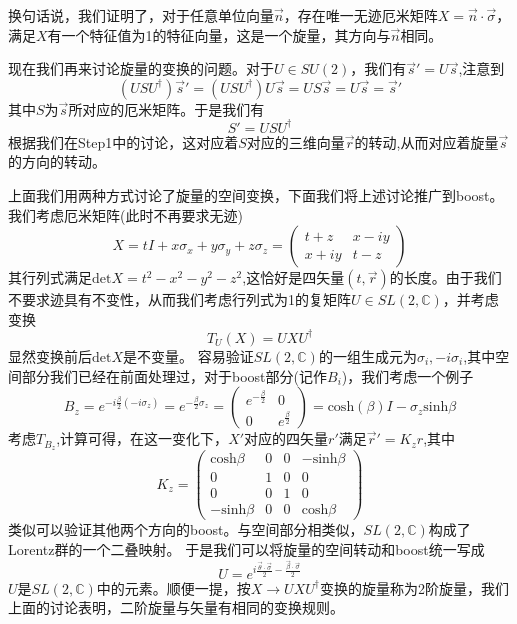换句话说，我们证明了，对于任意单位向量$\vec{n}$，存在唯一无迹厄米矩阵$X=\vec{n}\cdot\vec{\sigma}$，满足$X$有一个特征值为1的特征向量，这是一个旋量，其方向与$\vec{n}$相同。

现在我们再来讨论旋量的变换的问题。对于$U\in SU(2)$，我们有$\vec{s}'=U\vec{s}$,注意到
\begin{equation}
    (USU^{\dagger})\vec{s}'=(USU^{\dagger})U\vec{s}=US\vec{s}=U\vec{s}=\vec{s}'
\end{equation}
其中$S$为$\vec{s}$所对应的厄米矩阵。于是我们有
\begin{equation}
    S'=USU^{\dagger}
\end{equation}
根据我们在Step1中的讨论，这对应着$S$对应的三维向量$\vec{r}$的转动,从而对应着旋量$\vec{s}$的方向的转动。

上面我们用两种方式讨论了旋量的空间变换，下面我们将上述讨论推广到boost。
我们考虑厄米矩阵(此时不再要求无迹)
\begin{equation}
    X=tI+x\sigma_{x}+y\sigma_{y}+z\sigma_{z}=\left(\begin{array}{cc}
        t+z &x-iy  \\
        x+iy & t-z
    \end{array}\right)
\end{equation}
其行列式满足$\text{det}X=t^{2}-x^{2}-y^{2}-z^{2}$,这恰好是四矢量$(t,\vec{r})$的长度。由于我们不要求迹具有不变性，从而我们考虑行列式为1的复矩阵$U\in SL(2,\mathbb{C})$，并考虑变换
\begin{equation}
    T_{U}(X)=UXU^{\dagger}
\end{equation}
显然变换前后$\text{det}X$是不变量。
容易验证$SL(2,\mathbb{C})$的一组生成元为$\sigma_{i},-i\sigma_{i}$,其中空间部分我们已经在前面处理过，对于boost部分(记作$B_{i}$)，我们考虑一个例子
\begin{equation}
    B_{z}=e^{-i\frac{\beta}{2}(-i\sigma_{z})}=e^{-\frac{\beta}{2}\sigma_{z}}=\left(\begin{array}{cc}
       e^{-\frac{\beta}{2}}  & 0 \\
         0& e^{\frac{\beta}{2}} 
    \end{array}\right)=\text{cosh}(\beta)I-\sigma_{z}\text{sinh}\beta
\end{equation}
考虑$T_{B_{z}}$,计算可得，在这一变化下，$X'$对应的四矢量$r'$满足$\vec{r}'=K_{z}r$,其中
\begin{equation}
    K_{z}=\left(\begin{array}{cccc}
         \text{cosh}\beta&0&0&-\text{sinh}\beta  \\
         0&1&0&0\\
         0&0&1&0\\
         -\text{sinh}\beta&0&0&\text{cosh}\beta
    \end{array}\right)
\end{equation}
类似可以验证其他两个方向的boost。与空间部分相类似，$SL(2,\mathbb{C})$构成了Lorentz群的一个二叠映射。
于是我们可以将旋量的空间转动和boost统一写成
\begin{equation}
\label{chap4SL2}
    U=e^{i\frac{\vec{\theta}\cdot\vec{\sigma}}{2}-\frac{\vec{\beta}\cdot\vec{\sigma}}{2}}
\end{equation}
$U$是$SL(2,\mathbb{C})$中的元素。顺便一提，按$X\longrightarrow UXU^{\dagger}$变换的旋量称为2阶旋量，我们上面的讨论表明，二阶旋量与矢量有相同的变换规则。
